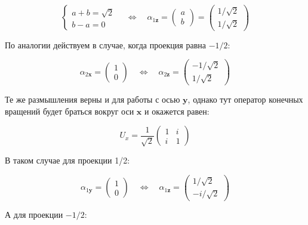 \documentclass[a4paper, 12pt]{article}
\newcommand{\qlrq}
{\ensuremath{\quad \Leftrightarrow \quad}} %
\begin{document}
\begin{equation}
	\begin{cases}
		a + b = \sqrt{2}\\
		b - a = 0
	\end{cases}
	\qlrq 	\boxed{\alpha_{1\mathbf{z}} = 
	\begin{pmatrix}
	a \\
	b
	\end{pmatrix}
	= 
	\begin{pmatrix}
		1/\sqrt{2}\\
		1/\sqrt{2}
	\end{pmatrix}}
\end{equation}

По аналогии действуем в случае, когда проекция равна $-1/2$:

\begin{equation}
	\alpha_{2\mathbf{x}} = 
	\begin{pmatrix}
	1\\
	0
	\end{pmatrix}
	\qlrq \boxed{\alpha_{2\mathbf{z}} = 
	\begin{pmatrix}
	-1/\sqrt{2}\\
	1/\sqrt{2}
	\end{pmatrix}}
\end{equation}

Те же размышления верны и для работы с осью $\mathbf{y}$, однако тут оператор конечных вращений будет браться вокруг оси $\mathbf{x}$ и окажется равен:

\begin{equation*}
	U_x = \frac{1}{\sqrt{2}}
	\begin{pmatrix}
		1 & i\\
		i & 1
	\end{pmatrix}
\end{equation*}

В таком случае для проекции 1/2:

\begin{equation}
	\alpha_{1\mathbf{y}} = 
	\begin{pmatrix}
	1\\
	0
	\end{pmatrix}
	\qlrq \boxed{\alpha_{1\mathbf{z}} = 
	\begin{pmatrix}
	 1 / \sqrt{2}\\
	 -i / \sqrt{2}
	\end{pmatrix}}
\end{equation}

А для проекции $-1/2$:
\end{document}
